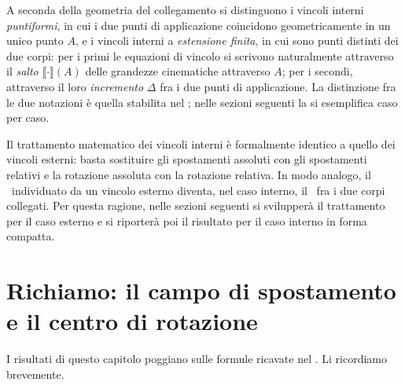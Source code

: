 A seconda della geometria del collegamento si distinguono i
vincoli interni \emph{puntiformi}, in cui i due punti di
applicazione coincidono geometricamente in un unico punto $A$,
e i vincoli interni a \emph{estensione finita}, in cui sono
punti distinti dei due corpi: per i primi le equazioni di
vincolo si scrivono naturalmente attraverso il \emph{salto}
$\llbracket \cdot \rrbracket(A)$ delle grandezze cinematiche
attraverso $A$; per i secondi, attraverso il loro
\emph{incremento} $\Delta$ fra i due punti di applicazione.
La distinzione fra le due notazioni è quella stabilita nel
; nelle sezioni seguenti la si
esemplifica caso per caso.

Il trattamento matematico dei vincoli interni è formalmente
identico a quello dei vincoli esterni: basta sostituire gli
spostamenti assoluti con gli spostamenti relativi e la
rotazione assoluta con la rotazione relativa. In modo analogo,
il \CRa\ individuato da un vincolo esterno diventa, nel caso
interno, il \CRr\ fra i due corpi collegati. Per questa
ragione, nelle sezioni seguenti si svilupperà il trattamento
per il caso esterno e si riporterà poi il risultato per il
caso interno in forma compatta.



\section{Richiamo: il campo di spostamento e il centro di rotazione}	\label{sec:richiamo}

I risultati di questo capitolo poggiano sulle formule ricavate
nel . Li ricordiamo
brevemente.

